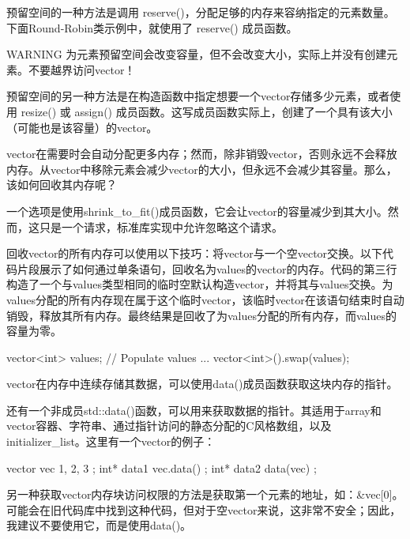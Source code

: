 预留空间的一种方法是调用 reserve()，分配足够的内存来容纳指定的元素数量。下面Round-Robin类示例中，就使用了 reserve() 成员函数。

\begin{myWarning}{WARNING}
为元素预留空间会改变容量，但不会改变大小，实际上并没有创建元素。不要越界访问vector！
\end{myWarning}

预留空间的另一种方法是在构造函数中指定想要一个vector存储多少元素，或者使用 resize() 或 assign() 成员函数。这写成员函数实际上，创建了一个具有该大小（可能也是该容量）的vector。


vector在需要时会自动分配更多内存；然而，除非销毁vector，否则永远不会释放内存。从vector中移除元素会减少vector的大小，但永远不会减少其容量。那么，该如何回收其内存呢？

一个选项是使用shrink\_to\_fit()成员函数，它会让vector的容量减少到其大小。然而，这只是一个请求，标准库实现中允许忽略这个请求。

回收vector的所有内存可以使用以下技巧：将vector与一个空vector交换。以下代码片段展示了如何通过单条语句，回收名为values的vector的内存。代码的第三行构造了一个与values类型相同的临时空默认构造vector，并将其与values交换。为values分配的所有内存现在属于这个临时vector，该临时vector在该语句结束时自动销毁，释放其所有内存。最终结果是回收了为values分配的所有内存，而values的容量为零。

\begin{cpp}
vector<int> values;
// Populate values ...
vector<int>().swap(values);
\end{cpp}


vector在内存中连续存储其数据，可以使用data()成员函数获取这块内存的指针。

还有一个非成员std::data()函数，可以用来获取数据的指针。其适用于array和vector容器、字符串、通过指针访问的静态分配的C风格数组，以及initializer\_list。这里有一个vector的例子：

\begin{cpp}
vector vec { 1, 2, 3 };
int* data1 { vec.data() };
int* data2 { data(vec) };
\end{cpp}

另一种获取vector内存块访问权限的方法是获取第一个元素的地址，如：\&vec[0]。可能会在旧代码库中找到这种代码，但对于空vector来说，这非常不安全；因此，我建议不要使用它，而是使用data()。


